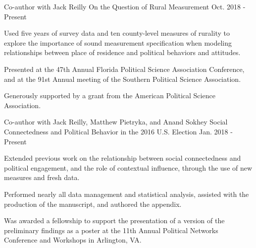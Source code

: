 

\begin{cventries}

    \cventry
      {Co-author with Jack Reilly} %
      {On the Question of Rural Measurement} %
      {Oct. 2018 - Present} %
      {} %
      {
        \begin{cvitems} %
          \item {Used five years of survey data and ten county-level measures of rurality to explore the importance of sound measurement specification when modeling relationships between place of residence and political behaviors and attitudes.}
          \item {Presented at the 47th Annual Florida Political Science Association Conference, and at the 91st Annual meeting of the Southern Political Science Association.}
          \item {Generously supported by a grant from the American Political Science Association.}
        \end{cvitems}
      }


    \cventry
      {Co-author with Jack Reilly, Matthew Pietryka, and Anand Sokhey} %
      {Social Connectedness and Political Behavior in the 2016 U.S. Election} %
      {Jan. 2018 - Present} %
      {} %
      {
        \begin{cvitems} %
          \item {Extended previous work on the relationship between social connectedness and political engagement, and the role of contextual influence, through the use of new measures and fresh data.}
          \item {Performed nearly all data management and statistical analysis, assisted with the production of the manuscript, and authored the appendix.}
          \item {Was awarded a fellowship to support the presentation of a version of the preliminary findings as a poster at the 11th Annual Political Networks Conference and Workshops in Arlington, VA.}
        \end{cvitems}
      }


\end{cventries}
